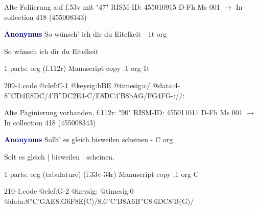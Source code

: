 \documentclass[twocolumn]{book}
\begin{document}
\newline Alte Foliierung auf f.53v mit "47"
\newline RISM-ID: 455010915
\newline D-Fh  Ms 001
\newline $\rightarrow$ In collection 418 (455008343)
      
\newline \par \vspace{7pt} \textcolor{darkblue}{\textbf{Anonymus  }}
\newline So wünsch' ich dir du Eitelkeit - 1t
\newline org
\newline \begin{itshape}[f.112r, heading:] So wünsch ich dir du Eitelkeit\end{itshape} 
\newline \textcolor{darkblue}{}  1 parts: org  (f.112r)
\newline Manuscript copy
.1  org  1t  
\begin{filecontents*}{209-1.code}
@clef:C-1
@keysig:bBE
@timesig:c/
@data:4-{8''CD}4E{8DC}/4'B''DC2E4-C/E{8DC}4'B{8bAG}/{FG}4FG-://:
\end{filecontents*}
\newline
%

\newline Alte Paginierung vorhanden, f.112r: "90"
\newline RISM-ID: 455011011
\newline D-Fh  Ms 001
\newline $\rightarrow$ In collection 418 (455008343)
      
\newline \par \vspace{7pt} \textcolor{darkblue}{\textbf{Anonymus  }}
\newline Sollt' es gleich bisweilen scheinen - C
\newline org
\newline \begin{itshape}[f.33v, at left:] Solt es gleich | bisweilen | scheinen.\end{itshape} 
\newline \textcolor{darkblue}{}  1 parts: org (tabulature)  (f.33v-34r)
\newline Manuscript copy
.1  org  C  
\begin{filecontents*}{210-1.code}
@clef:G-2
@keysig:
@timesig:0
@data:{8''C'GAE}{8.G6F8E(C)}/{8.6''C'B8A6B''C}{8.6DC8'B(G)}/
\end{filecontents*}
\newline
%
\end{document}

